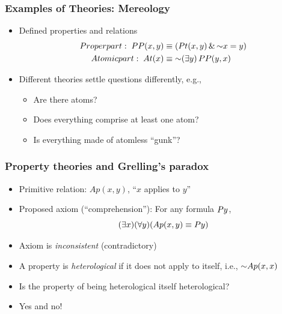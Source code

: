 \begin{frame}
  \frametitle{Examples of Theories: Mereology}

\begin{itemize}[<+->]
\item Defined properties and relations
\begin{align*}
Proper part: \; PP\qrp{x}{y} & \eiff (Pt\qrp{x}{y} \land \lnot x = y) \\
Atomic part: \; At\qvp{x} & \eiff \lnot\qt{\exists}{y}\,PP\qrp{y}{x}
\end{align*}
\item Different theories settle questions differently, e.g.,
\begin{itemize}[<+->]
\item Are there atoms?
\item Does everything comprise at least one atom?
\item Is everything made of atomless ``gunk''?
\end{itemize}
\end{itemize}

\end{frame}

\begin{frame}
    \frametitle{Property theories and Grelling's paradox}

\begin{itemize}[<+->]
\item Primitive relation: $Ap(x ,y)$, ``$x$ applies to $y$''
\item Proposed axiom (``comprehension''): For any formula $Py$,
\[
(\exists x)(\forall y)(Ap(x, y) \equiv Py)
\]
\item Axiom is \emph{inconsistent} (contradictory)
\item A property is \emph{heterological} if it does not apply to itself, i.e., $
 \lnot Ap\qrp{x}{x}$
\item Is the property of being heterological itself heterological?
\item[] Yes and no!
\begin{fitchproof}
\end{fitchproof}
\end{itemize}
\end{frame}

